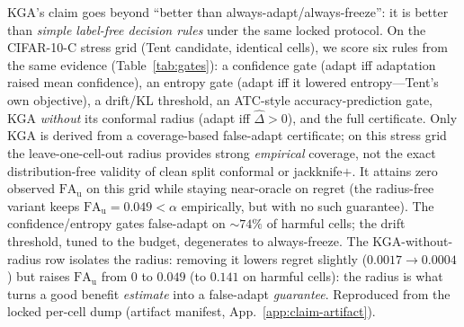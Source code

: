 \textsc{KGA}'s claim goes beyond ``better than always-adapt/always-freeze'': it is better than
\emph{simple label-free decision rules} under the same locked protocol. On the CIFAR-10-C stress grid
(Tent candidate, identical cells), we score six rules from the same evidence
(Table~\ref{tab:gates}): a confidence gate (adapt iff adaptation raised mean confidence), an entropy
gate (adapt iff it lowered entropy---Tent's own objective), a drift/KL threshold, an ATC-style
accuracy-prediction gate, \textsc{KGA} \emph{without} its conformal radius (adapt iff
$\widehat\Delta>0$), and the full certificate. Only KGA is derived from a coverage-based false-adapt certificate; on this stress grid the
leave-one-cell-out radius provides strong \emph{empirical} coverage, not the exact distribution-free
validity of clean split conformal or jackknife$+$. It attains zero observed $\mathrm{FA}_{\mathrm u}$ on this grid while
staying near-oracle on regret (the radius-free variant keeps $\mathrm{FA}_{\mathrm u}{=}0.049{<}\alpha$
empirically, but with no such guarantee). The
confidence/entropy gates false-adapt on ${\sim}74\%$ of harmful cells; the drift threshold, tuned to
the budget, degenerates to always-freeze. The \textsc{KGA}-without-radius row isolates the radius:
removing it lowers regret slightly ($0.0017\!\to\!0.0004$) but raises $\mathrm{FA}_{\mathrm u}$ from
$0$ to $0.049$ (to $0.141$ on harmful cells): the radius is what turns a good benefit \emph{estimate}
into a false-adapt \emph{guarantee}. Reproduced from the locked per-cell dump (artifact manifest,
App.~\ref{app:claim-artifact}).

